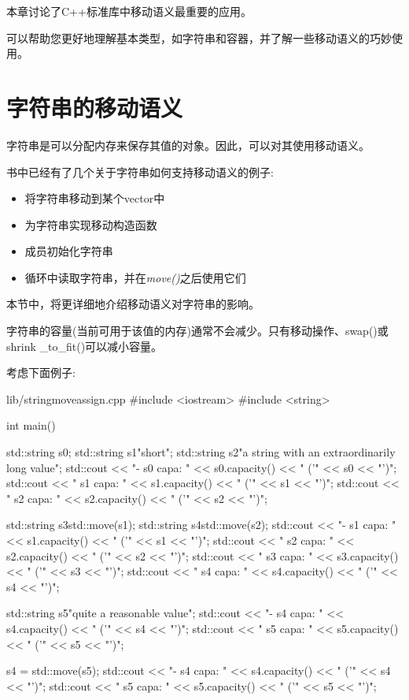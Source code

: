 
本章讨论了C++标准库中移动语义最重要的应用。\par

可以帮助您更好地理解基本类型，如字符串和容器，并了解一些移动语义的巧妙使用。\par


\section{字符串的移动语义}

字符串是可以分配内存来保存其值的对象。因此，可以对其使用移动语义。\par

书中已经有了几个关于字符串如何支持移动语义的例子:\par

\begin{itemize}
  \item 将字符串移动到某个vector中
  \item 为字符串实现移动构造函数
  \item 成员初始化字符串
  \item 循环中读取字符串，并在\textit{move()}之后使用它们
\end{itemize}

本节中，将更详细地介绍移动语义对字符串的影响。\par


字符串的容量(当前可用于该值的内存)通常不会减少。只有移动操作、swap()或shrink \_to\_fit()可以减小容量。\par

考虑下面例子:\par

\begin{codeboxt}[cpp]{lib/stringmoveassign.cpp}
#include <iostream>
#include <string>

int main()
{
  std::string s0;
  std::string s1{"short"};
  std::string s2{"a string with an extraordinarily long value"};
  std::cout << "- s0 capa: " << s0.capacity() << " ('" << s0 << "')\n";
  std::cout << " s1 capa: " << s1.capacity() << " ('" << s1 << "')\n";
  std::cout << " s2 capa: " << s2.capacity() << " ('" << s2 << "')\n";

  std::string s3{std::move(s1)};
  std::string s4{std::move(s2)};
  std::cout << "- s1 capa: " << s1.capacity() << " ('" << s1 << "')\n";
  std::cout << " s2 capa: " << s2.capacity() << " ('" << s2 << "')\n";
  std::cout << " s3 capa: " << s3.capacity() << " ('" << s3 << "')\n";
  std::cout << " s4 capa: " << s4.capacity() << " ('" << s4 << "')\n";

  std::string s5{"quite a reasonable value"};
  std::cout << "- s4 capa: " << s4.capacity() << " ('" << s4 << "')\n";
  std::cout << " s5 capa: " << s5.capacity() << " ('" << s5 << "')\n";

  s4 = std::move(s5);
  std::cout << "- s4 capa: " << s4.capacity() << " ('" << s4 << "')\n";
  std::cout << " s5 capa: " << s5.capacity() << " ('" << s5 << "')\n";
}
\end{codeboxt}

